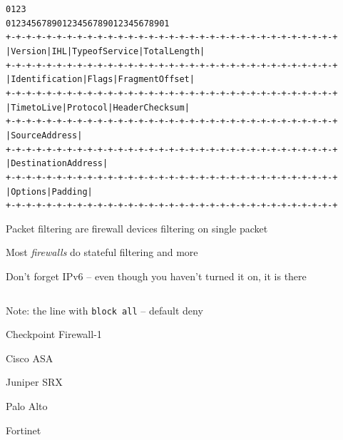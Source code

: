 \documentclass[Screen16to9,17pt]{foils}
\begin{document}
\begin{alltt}\footnotesize
0                   1                   2                   3
0 1 2 3 4 5 6 7 8 9 0 1 2 3 4 5 6 7 8 9 0 1 2 3 4 5 6 7 8 9 0 1
+-+-+-+-+-+-+-+-+-+-+-+-+-+-+-+-+-+-+-+-+-+-+-+-+-+-+-+-+-+-+-+-+
|Version|  IHL  |Type of Service|          Total Length         |
+-+-+-+-+-+-+-+-+-+-+-+-+-+-+-+-+-+-+-+-+-+-+-+-+-+-+-+-+-+-+-+-+
|         Identification        |Flags|      Fragment Offset    |
+-+-+-+-+-+-+-+-+-+-+-+-+-+-+-+-+-+-+-+-+-+-+-+-+-+-+-+-+-+-+-+-+
|  Time to Live |    Protocol   |         Header Checksum       |
+-+-+-+-+-+-+-+-+-+-+-+-+-+-+-+-+-+-+-+-+-+-+-+-+-+-+-+-+-+-+-+-+
|                       Source Address                          |
+-+-+-+-+-+-+-+-+-+-+-+-+-+-+-+-+-+-+-+-+-+-+-+-+-+-+-+-+-+-+-+-+
|                    Destination Address                        |
+-+-+-+-+-+-+-+-+-+-+-+-+-+-+-+-+-+-+-+-+-+-+-+-+-+-+-+-+-+-+-+-+
|                    Options                    |    Padding    |
+-+-+-+-+-+-+-+-+-+-+-+-+-+-+-+-+-+-+-+-+-+-+-+-+-+-+-+-+-+-+-+-+
\end{alltt}

\begin{list1}
\item Packet filtering are firewall devices filtering on single packet
\item Most \emph{firewalls} do stateful filtering and more
\item Don't forget IPv6 -- even though you haven't turned it on, it is there
\end{list1}



\begin{figure}[H]\tiny
\inputminted{shell}{policies/gateway-config-simple.conf}
\end{figure}

Note: the line with \verb+block all+ -- default deny

\begin{list2}
\item Checkpoint Firewall-1 
\item Cisco ASA 
\item Juniper SRX 
\item Palo Alto 
\item Fortinet 
\end{list2}
\end{document}
